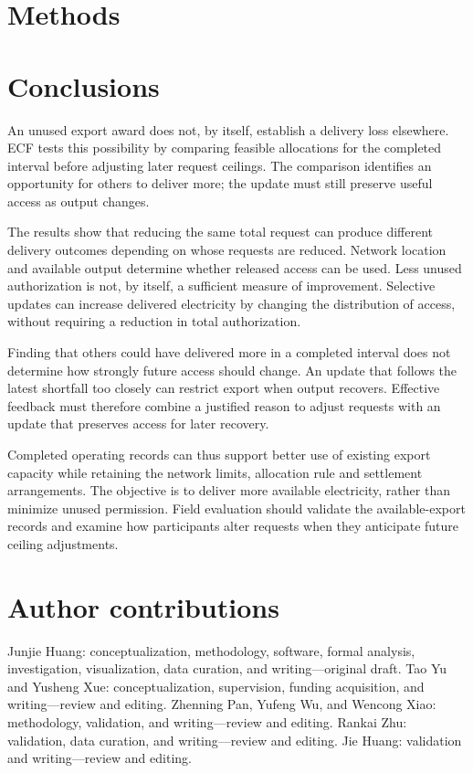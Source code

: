 \documentclass[twoside,twocolumn,9pt]{article}
\begin{document}
\FloatBarrier

\section{Methods}
\label{sec:methods}

\EESsystemmethod
\EESbehaviormethod
\EESallocationmethod
\EESfeedbackmethod
\EESphysicalmethod
\EESexperimentalmethod
\EESaustralianmethod

\section{Conclusions}
\label{sec:conclusion}

An unused export award does not, by itself, establish a delivery loss elsewhere.
ECF tests this possibility by comparing feasible allocations for the completed
interval before adjusting later request ceilings. The comparison identifies
an opportunity for others to deliver more; the update must still preserve
useful access as output changes.

The results show that reducing the same total request can produce different
delivery outcomes depending on whose requests are reduced. Network location
and available output determine whether released access can be used. Less
unused authorization is not, by itself, a sufficient measure of improvement.
Selective updates can increase delivered electricity by changing the
distribution of access, without requiring a reduction in total authorization.

Finding that others could have delivered more in a completed interval does
not determine how strongly future access should change. An update that follows the latest
shortfall too closely can restrict export when output recovers. Effective
feedback must therefore combine a justified reason to adjust requests with an
update that preserves access for later recovery.

Completed operating records can thus support better use of existing export
capacity while retaining the network limits, allocation rule and settlement
arrangements. The objective is to deliver more available electricity, rather
than minimize unused permission. Field evaluation should validate the
available-export records and examine how participants alter requests when they
anticipate future ceiling adjustments.

\section*{Author contributions}
Junjie Huang: conceptualization, methodology, software, formal analysis,
investigation, visualization, data curation, and writing---original draft.
Tao Yu and Yusheng Xue: conceptualization, supervision, funding acquisition, and
writing---review and editing. Zhenning Pan, Yufeng Wu, and Wencong Xiao:
methodology, validation, and writing---review and editing. Rankai Zhu:
validation, data curation, and writing---review and editing. Jie Huang:
validation and writing---review and editing.
\end{document}
